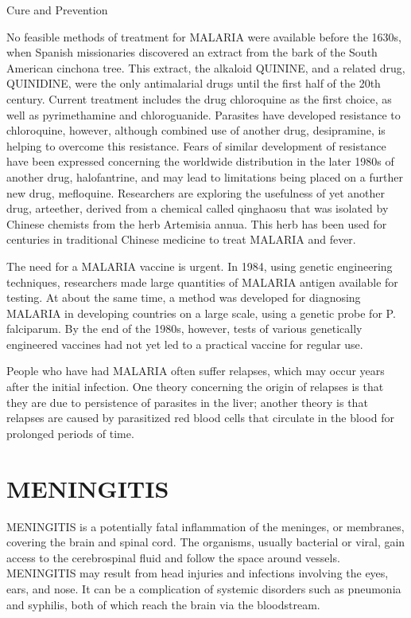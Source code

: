 Cure and Prevention

No feasible methods of treatment for MALARIA were available 
before the 1630s, when Spanish missionaries discovered an 
extract from the bark of the South American cinchona tree. 
This extract, the alkaloid QUININE, and a related drug, 
QUINIDINE, were the only antimalarial drugs until the first 
half of the 20th century.  Current treatment includes the drug 
chloroquine as the first choice, as well as pyrimethamine and 
chloroguanide.  Parasites have developed resistance to 
chloroquine, however, although combined use of another drug, 
desipramine, is helping to overcome this resistance.  Fears of 
similar development of resistance have been expressed 
concerning the worldwide distribution in the later 1980s of 
another drug, halofantrine, and may lead to limitations being 
placed on a further new drug, mefloquine.  Researchers are 
exploring the usefulness of yet another drug, arteether, 
derived from a chemical called qinghaosu that was isolated by 
Chinese chemists from the herb Artemisia annua.  This herb has 
been used for centuries in traditional Chinese medicine to 
treat MALARIA and fever. 

The need for a MALARIA vaccine is urgent.  In 1984, using 
genetic engineering techniques, researchers made large 
quantities of MALARIA antigen available for testing.  At about 
the same time, a method was developed for diagnosing MALARIA 
in developing countries on a large scale, using a genetic 
probe for P. falciparum.  By the end of the 1980s, however, 
tests of various genetically engineered vaccines had not yet 
led to a practical vaccine for regular use. 

People who have had MALARIA often suffer relapses, which may 
occur years after the initial infection.  One theory 
concerning the origin of relapses is that they are due to 
persistence of parasites in the liver;  another theory is that 
relapses are caused by parasitized red blood cells that 
circulate in the blood for prolonged periods of time. 
 
\section*{MENINGITIS}
 MENINGITIS is a potentially fatal inflammation of the meninges,
or membranes, covering the brain and spinal cord.  The 
organisms, usually bacterial or viral, gain access to the 
cerebrospinal fluid and follow the space around vessels. 
MENINGITIS may result from head injuries and infections 
involving the eyes, ears, and nose.  It can be a complication 
of systemic disorders such as pneumonia and syphilis, both of 
which reach the brain via the bloodstream. 

